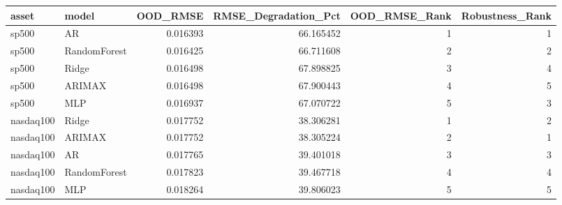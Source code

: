 \begin{tabular}{llrrrr}
\toprule
asset & model & OOD_RMSE & RMSE_Degradation_Pct & OOD_RMSE_Rank & Robustness_Rank \\
\midrule
sp500 & AR & 0.016393 & 66.165452 & 1 & 1 \\
sp500 & RandomForest & 0.016425 & 66.711608 & 2 & 2 \\
sp500 & Ridge & 0.016498 & 67.898825 & 3 & 4 \\
sp500 & ARIMAX & 0.016498 & 67.900443 & 4 & 5 \\
sp500 & MLP & 0.016937 & 67.070722 & 5 & 3 \\
nasdaq100 & Ridge & 0.017752 & 38.306281 & 1 & 2 \\
nasdaq100 & ARIMAX & 0.017752 & 38.305224 & 2 & 1 \\
nasdaq100 & AR & 0.017765 & 39.401018 & 3 & 3 \\
nasdaq100 & RandomForest & 0.017823 & 39.467718 & 4 & 4 \\
nasdaq100 & MLP & 0.018264 & 39.806023 & 5 & 5 \\
\bottomrule
\end{tabular}
